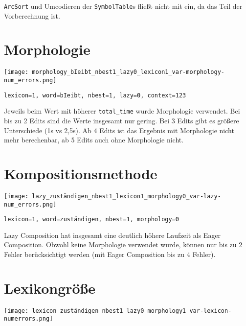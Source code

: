 \documentclass[12pt]{article}
\begin{document}
\verb+ArcSort+ und Umcodieren der \verb+SymbolTable+s fließt nicht mit ein,
da das Teil der Vorberechnung ist.


\section{Morphologie}

\texttt{[image: morphology\_bIeibt\_nbest1\_lazy0\_lexicon1\_var-morphology-num\_errors.png]}


\verb+lexicon=1, word=bIeibt, nbest=1, lazy=0, context=123+

Jeweils beim Wert mit höherer \verb+total_time+ wurde Morphologie
verwendet.
Bei bis zu 2 Edits sind die Werte insgesamt nur gering.
Bei 3 Edits gibt es größere Unterschiede (1s vs 2,5s).
Ab 4 Edits ist das Ergebnis mit Morphologie nicht mehr berechenbar, ab 5
Edits auch ohne Morphologie nicht.


\section{Kompositionsmethode}

\texttt{[image: lazy\_zuständigen\_nbest1\_lexicon1\_morphology0\_var-lazy-num\_errors.png]}

\verb+lexicon=1, word=zuständigen, nbest=1, morphology=0+


Lazy Composition hat insgesamt eine deutlich höhere Laufzeit als Eager
Composition.
Obwohl keine Morphologie verwendet wurde, können nur bis zu 2 Fehler
berücksichtigt werden (mit Eager Composition bis zu 4 Fehler).


\section{Lexikongröße}


%


\texttt{[image: lexicon\_zuständigen\_nbest1\_lazy0\_morphology1\_var-lexicon-numerrors.png]}
\end{document}
